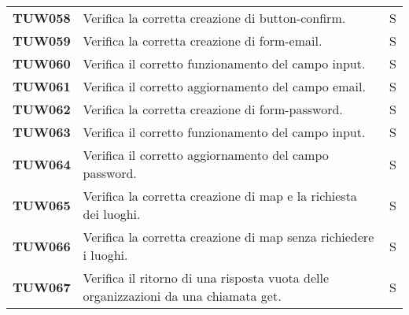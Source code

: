 \documentclass[../../piano-di-qualifica.tex]{subfiles}
\begin{document}
\begin{longtable}[H]{>{\centering\bfseries}m{3cm} >{}m{10cm} >{\centering\arraybackslash}m{3cm}}

  TUW058             & Verifica la corretta creazione di button-confirm.                                                                   & S                             \\


  TUW059             & Verifica la corretta creazione di form-email.                                                                       & S                             \\

  TUW060             & Verifica il corretto funzionamento del campo input.                                                                 & S                             \\

  TUW061             & Verifica il corretto aggiornamento del campo email.                                                                 & S                             \\


  TUW062             & Verifica la corretta creazione di form-password.                                                                    & S                             \\

  TUW063             & Verifica il corretto funzionamento del campo input.                                                                 & S                             \\

  TUW064             & Verifica il corretto aggiornamento del campo password.                                                              & S                             \\


  TUW065             & Verifica la corretta creazione di map e la richiesta dei luoghi.                                                    & S                             \\

  TUW066             & Verifica la corretta creazione di map senza richiedere i luoghi.                                                    & S                             \\

  TUW067             & Verifica il ritorno di una risposta vuota delle organizzazioni da una chiamata get.                                 & S                             \\


\end{longtable}
\end{document}
